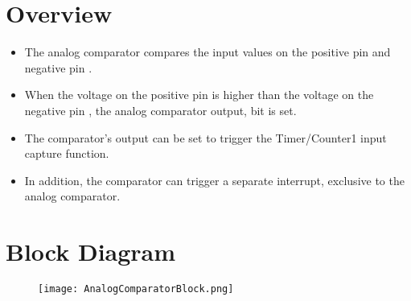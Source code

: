 

% 

\section{Overview}
\begin{itemize}
    \item The analog comparator compares the input values on the positive pin  and negative pin .
    \item When the voltage on the positive pin  is higher than the voltage on the negative pin , the analog comparator output,  bit is set.
    \item The comparator’s output can be set to trigger the Timer/Counter1 input capture function.
    \item In addition, the comparator can trigger a separate interrupt, exclusive to the analog comparator. 
\end{itemize}
\section{Block Diagram}
\begin{figure}[H]
    \centering
    \texttt{[image: AnalogComparatorBlock.png]}
\end{figure}

